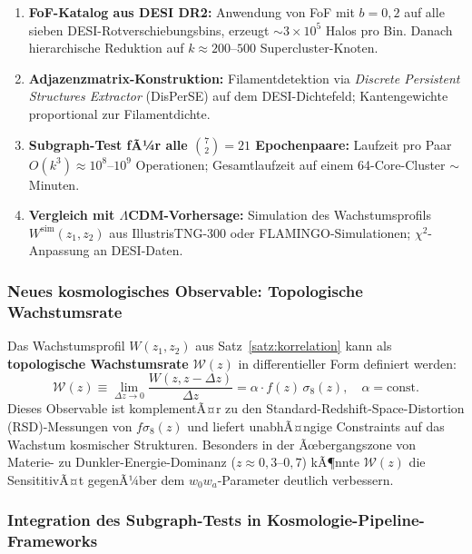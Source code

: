﻿\documentclass[a4paper,12pt]{article}
\theoremstyle{definition}
\theoremstyle{remark}
\begin{document}
\begin{enumerate}[label=\arabic*.]
  \item \textbf{FoF-Katalog aus DESI DR2:} Anwendung von FoF mit $b = 0{,}2$
    auf alle sieben DESI-Rotverschiebungsbins, erzeugt $\sim 3 \times 10^5$
    Halos pro Bin. Danach hierarchische Reduktion auf $k \approx 200$--$500$
    Supercluster-Knoten.
  \item \textbf{Adjazenzmatrix-Konstruktion:} Filamentdetektion via
    \textit{Discrete Persistent Structures Extractor} (DisPerSE) auf dem
    DESI-Dichtefeld; Kantengewichte proportional zur Filamentdichte.
  \item \textbf{Subgraph-Test fÃ¼r alle $\binom{7}{2} = 21$ Epochenpaare:}
    Laufzeit pro Paar $O(k^3) \approx 10^8$--$10^9$ Operationen;
    Gesamtlaufzeit auf einem 64-Core-Cluster $\sim$ Minuten.
  \item \textbf{Vergleich mit $\Lambda$CDM-Vorhersage:} Simulation des
    Wachstumsprofils $W^\mathrm{sim}(z_1,z_2)$ aus IllustrisTNG-300 oder
    FLAMINGO-Simulationen; $\chi^2$-Anpassung an DESI-Daten.
\end{enumerate}

\subsubsection*{Neues kosmologisches Observable: Topologische Wachstumsrate}

Das Wachstumsprofil $W(z_1,z_2)$ aus Satz~\ref{satz:korrelation} kann als
\textbf{topologische Wachstumsrate} $\mathcal{W}(z)$ in differentieller Form
definiert werden:
\begin{equation}
  \label{eq:toprate}
  \mathcal{W}(z) \equiv \lim_{\Delta z \to 0}
  \frac{W(z, z - \Delta z)}{\Delta z}
  = \alpha \cdot f(z)\,\sigma_8(z),\quad \alpha = \text{const.}
\end{equation}
Dieses Observable ist komplementÃ¤r zu den Standard-Redshift-Space-Distortion
(RSD)-Messungen von $f\sigma_8(z)$ und liefert unabhÃ¤ngige Constraints auf
das Wachstum kosmischer Strukturen. Besonders in der Ãœbergangszone von
Materie- zu Dunkler-Energie-Dominanz ($z \approx 0{,}3$--$0{,}7$) kÃ¶nnte
$\mathcal{W}(z)$ die SensititivÃ¤t gegenÃ¼ber dem $w_0 w_a$-Parameter
deutlich verbessern.

\subsubsection*{Integration des Subgraph-Tests in Kosmologie-Pipeline-Frameworks}
\end{document}
